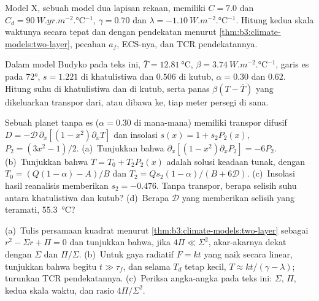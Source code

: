 \begin{exercise}[$\star\star$]\label{exo:b3:climate-models:8}
Model X, sebuah model dua lapisan rekaan, memiliki $C = 7.0$ dan $C_d =
\qty{90}{W.yr.m^{-2}.\celsius^{-1}}$, $\gamma = 0.70$ dan $\lambda =
\qty{-1.10}{W.m^{-2}.\celsius^{-1}}$. Hitung kedua skala waktunya secara tepat
dan dengan pendekatan menurut \cref{thm:b3:climate-models:two-layer}, pecahan
$a_f$, ECS-nya, dan TCR pendekatannya.
\end{exercise}

\begin{exercise}[$\star\star$]\label{exo:b3:climate-models:9}
Dalam model Budyko pada teks ini, $\bar T = \qty{12.81}{\celsius}$, $\beta =
\qty{3.74}{W.m^{-2}.\celsius^{-1}}$, garis es pada \ang{72}, $s = 1.221$
di khatulistiwa dan $0.506$ di kutub, $\alpha = 0.30$ dan $0.62$.
Hitung suhu di khatulistiwa dan di kutub, serta panas
$\beta(T - \bar T)$ yang dikeluarkan transpor dari, atau dibawa ke, tiap
meter persegi di sana.
\end{exercise}

\begin{exercise}[$\star\star\star$]\label{exo:b3:climate-models:10}
Sebuah planet tanpa es ($\alpha = 0.30$ di mana-mana) memiliki transpor
difusif $D = -\mathcal D\,\partial_x[(1 - x^2)\partial_xT]$ dan
insolasi $s(x) = 1 + s_2P_2(x)$, $P_2 = (3x^2 - 1)/2$. (a)~Tunjukkan bahwa
$\partial_x[(1 - x^2)\partial_xP_2] = -6P_2$. (b)~Tunjukkan bahwa $T = T_0 +
T_2P_2(x)$ adalah solusi keadaan tunak, dengan $T_0 = (Q(1 - \alpha) - A)/B$ dan
$T_2 = Qs_2(1 - \alpha)/(B + 6\mathcal D)$. (c)~Insolasi
hasil reanalisis memberikan $s_2 = \num{-0.476}$. Tanpa transpor, berapa selisih suhu
antara khatulistiwa dan kutub? (d)~Berapa $\mathcal D$ yang memberikan
selisih yang teramati, \qty{55.3}{\celsius}?
\end{exercise}

\begin{exercise}[$\star\star\star$]\label{exo:b3:climate-models:11}
(a)~Tulis persamaan kuadrat menurut \cref{thm:b3:climate-models:two-layer} sebagai $r^2 -
\Sigma r + \Pi = 0$ dan tunjukkan bahwa, jika $4\Pi \ll \Sigma^2$, akar-akarnya
dekat dengan $\Sigma$ dan $\Pi/\Sigma$. (b)~Untuk gaya radiatif $F = kt$ yang naik
secara linear, tunjukkan bahwa begitu $t \gg \tau_f$, dan selama $T_d$ tetap kecil,
$T \approx kt/(\gamma - \lambda)$; turunkan TCR pendekatannya. (c)~Periksa
angka-angka pada teks ini: $\Sigma$, $\Pi$, kedua skala waktu, dan
rasio $4\Pi/\Sigma^2$.
\end{exercise}

